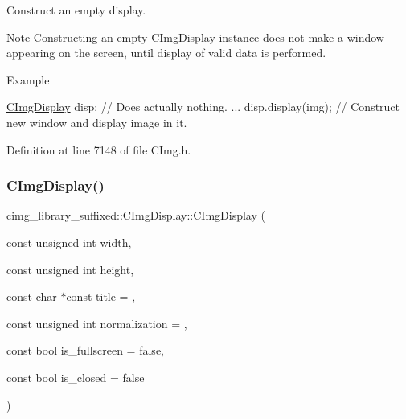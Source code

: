 Construct an empty display. 

\begin{DoxyNote}{Note}
Constructing an empty \hyperlink{structcimg__library__suffixed_1_1CImgDisplay}{C\+Img\+Display} instance does not make a window appearing on the screen, until display of valid data is performed. 
\end{DoxyNote}
\begin{DoxyParagraph}{Example}

\begin{DoxyCode}
\hyperlink{structcimg__library__suffixed_1_1CImgDisplay_a7716ca9a49ff94123b3417556bf4ce49}{CImgDisplay} disp;  \textcolor{comment}{// Does actually nothing.}
...
disp.display(img); \textcolor{comment}{// Construct new window and display image in it.}
\end{DoxyCode}
 
\end{DoxyParagraph}


Definition at line 7148 of file C\+Img.\+h.

\mbox{\label{structcimg__library__suffixed_1_1CImgDisplay_a72f6d07a281eb2ddd93ae3e0adbb24db}} 
\subsubsection{\texorpdfstring{C\+Img\+Display()}{CImgDisplay()}\hspace{0.1cm}{\footnotesize\ttfamily [2/5]}}
{\footnotesize\ttfamily cimg\+\_\+library\+\_\+suffixed\+::\+C\+Img\+Display\+::\+C\+Img\+Display (\begin{DoxyParamCaption}\item[{const unsigned int}]{width,  }\item[{const unsigned int}]{height,  }\item[{const \hyperlink{classchar}{char} $\ast$const}]{title = {},  }\item[{const unsigned int}]{normalization = {},  }\item[{const bool}]{is\+\_\+fullscreen = {\ttfamily false},  }\item[{const bool}]{is\+\_\+closed = {\ttfamily false} }\end{DoxyParamCaption})\hspace{0.3cm}{\ttfamily [inline]}}



